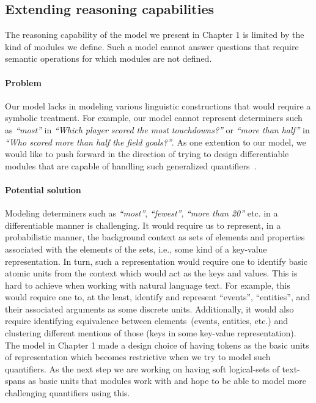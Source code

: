 \documentclass[main.tex]{subfiles}
\begin{document}
\subsection{Extending reasoning capabilities}
The reasoning capability of the model we present in Chapter 1 is limited by the kind of modules we define. Such a model cannot answer questions that require semantic operations for which modules are not defined.  %

\paragraph{Problem}
Our model lacks in modeling various linguistic constructions that would require a symbolic treatment. For example, our model cannot represent determiners such as \textit{``most''} in \textit{``Which player scored the most touchdowns?''} or \textit{``more than half''} in \textit{``Who scored more than half the field goals?''}.
As one extention to our model, we would like to push forward in the direction of trying to design differentiable modules that are capable of handling such generalized quantifiers~\cite{gq-mostowski-1957}.

\paragraph{Potential solution}
Modeling determiners such as \textit{``most''}, \textit{``fewest''}, \textit{``more than 20''} etc. in a differentiable manner is challenging.
It would require us to represent, in a probabilistic manner, the background context as sets of elements and properties associated with the elements of the sets, i.e., some kind of a key-value representation.  In turn, such a representation would require one to identify basic atomic units from the context which would act as the keys and values.  This is hard to achieve when working with natural language text.  For example, this would require one to, at the least, identify and represent ``events'', ``entities'', and their associated arguments as some discrete units.  Additionally, it would also require identifying equivalence between elements~(events, entities, etc.) and clustering different mentions of those (keys in some key-value representation).
The model in Chapter 1 made a design choice of having tokens as the basic units of representation which becomes restrictive when we try to model such quantifiers.  As the next step we are working on having soft logical-sets of text-spans as basic units that modules work with and hope to be able to model more challenging quantifiers using this.
\end{document}
